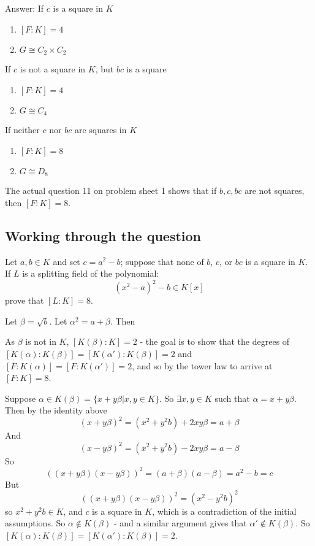 \documentclass{article}
\theoremstyle{definition}
\theoremstyle{plain}%
\theoremstyle{remark}
\begin{document}
Answer:
If $c$ is a square in $K$
\begin{enumerate}
    \item $[F : K] = 4$
    \item $G \cong C_2 \times C_2$
\end{enumerate}
If $c$ is not a square in $K$, but $bc$ is a square
\begin{enumerate}
    \item $[F : K] = 4$
    \item $G \cong C_4$
\end{enumerate}
If neither $c$ nor $bc$ are squares in $K$
\begin{enumerate}
    \item $[F : K] = 8$
    \item $G \cong D_8$
\end{enumerate}

The actual question 11 on problem sheet 1 shows that if $b,c, bc$ are not squares, then $[F : K] = 8$.

\subsection{Working through the question}
Let $a, b \in K$ and set $c = a^2 - b$; suppose that none of $b$, $c$, or $bc$ is a square in $K$.
If $L$ is a splitting field of the polynomial:
\[(x^2 - a)^2 - b \in K[x]\]
prove that $[L : K] = 8$.

Let $\beta = \sqrt{b}$. Let $\alpha^2 = a + \beta$. Then


As $\beta$ is not in $K$, $[K(\beta) : K] = 2$ - the goal is to show that the degrees of $[K(\alpha) : K(\beta)] = [K(\alpha') : K(\beta) ] = 2$ and $[F : K(\alpha)] = [F : K(\alpha')] = 2$, and so by the tower law to arrive at $[F : K] = 8$.

Suppose $\alpha \in K(\beta) = \{ x + y\beta | x, y \in K \}$. So $\exists x, y \in K$ such that $\alpha = x + y\beta$. Then by the identity above
\[(x + y\beta)^2 = (x^2 + y^2b) + 2xy\beta = a + \beta\]
And
\[(x - y\beta)^2 = (x^2 + y^2b) - 2xy\beta = a - \beta\]
So
\[((x + y\beta)(x - y\beta))^2 = (a + \beta)(a - \beta) = a^2 - b = c\]
But
\[((x + y\beta)(x - y\beta))^2 = (x^2 - y^2b)^2\]
so $x^2 + y^2b \in K$, and $c$ is a square in $K$, which is a contradiction of the initial assumptions. So $\alpha \not \in K(\beta)$ - and a similar argument gives that $\alpha' \not \in K(\beta)$. So $[K(\alpha) : K(\beta)] = [K(\alpha') : K(\beta)] = 2$.
\end{document}
